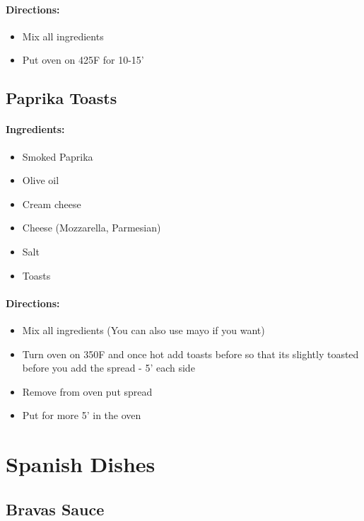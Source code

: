 \documentclass{article}
\begin{document}
\paragraph{Directions:}
\begin{itemize}
	\item Mix all ingredients
	\item Put oven on 425F for 10-15'
\end{itemize}

\subsection{Paprika Toasts}

\paragraph{Ingredients:}

\begin{itemize}
	\item Smoked Paprika
	\item Olive oil
	\item Cream cheese
	\item Cheese (Mozzarella, Parmesian)
	\item Salt
	\item Toasts
\end{itemize}

\paragraph{Directions:}
\begin{itemize}
	\item Mix all ingredients (You can also use mayo if you want)
	\item Turn oven on 350F and once hot add toasts before so that its slightly toasted before you add the spread - 5' each side
	\item Remove from oven put spread
	\item Put for more 5' in the oven
\end{itemize}


\section{Spanish Dishes}


\subsection{Bravas Sauce}
\end{document}
